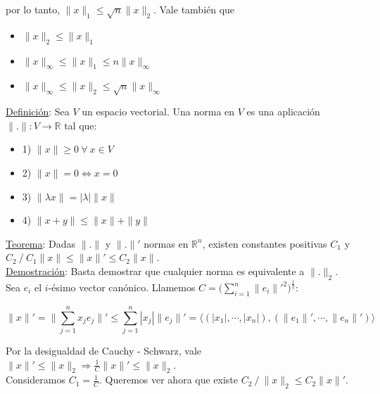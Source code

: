 por lo tanto, $\|x\|_{1} \leq \sqrt{n}\|x\|_{2}$. Vale tambi\'en que

\begin{itemize}
	\item $\|x\|_{2} \leq \|x\|_{1}$

	\item $\|x\|_{\infty} \leq \|x\|_{1} \leq n\|x\|_{\infty}$
	
	\item $\|x\|_{\infty} \leq \|x\|_{2} \leq \sqrt{n}\|x\|_{\infty}$\\
\end{itemize}

\underline{Definici\'on}: Sea $V$ un espacio vectorial. Una norma en $V$ es una aplicaci\'on $\|.\|: V \rightarrow \mathbb{R}$ tal que:

\begin{itemize}
	\item 1) $\|x\| \geq 0\ \forall \ x \in V$
	
	\item 2) $\|x\| = 0 \iff x = 0$
	
	\item 3) $\|\lambda x\| = |\lambda|\|x\|$
	
	\item 4) $\|x + y\| \leq \|x\| + \|y\|$\\
\end{itemize}

\underline{Teorema}: Dadas $\|.\|$ y $\|.\|'$ normas en $\mathbb{R}^{n}$, existen constantes positivas $C_{1}$ y $C_{2}\ / \ C_{1}\|x\| \leq \|x\|' \leq C_{2}\|x\|$.\\

\underline{Demostraci\'on}: Basta demostrar que cualquier norma es equivalente a $\|.\|_{2}$.\\

Sea $e_{i}$ el $i$-\'esimo vector can\'onico. Llamemos $C = \bigg(\sum \limits_{i = 1}^{n} \|e_{i}\|'^{2}\bigg)^{\frac{1}{2}}$:

$$\|x\|' = \bigg\|\sum \limits_{j = 1}^{n} x_{j}e_{j}\bigg\|' \leq \sum \limits_{j = 1}^{n} |x_{j}|\|e_{j}\|' = \langle (|x_{1}|, \cdots, |x_{n}|), (\|e_{1}\|', \cdots, \|e_{n}\|') \rangle$$

Por la desigualdad de Cauchy - Schwarz, vale $\|x\|' \leq \|x\|_{2} \Rightarrow \frac{1}{C}\|x\|' \leq \|x\|_{2}$.\\

Consideramos $C_{1} = \frac{1}{C}$. Queremos ver ahora que existe $C_{2}\ / \ \|x\|_{2} \leq C_{2}\|x\|'$.\\

